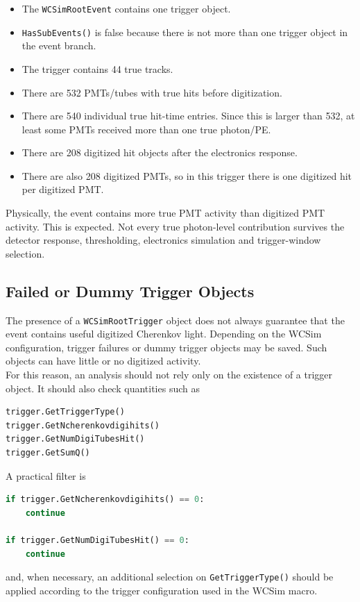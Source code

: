\documentclass{article}
\numberwithin{table}{subsection}
\numberwithin{figure}{subsection}
\numberwithin{equation}{subsection}
\numberwithin{footnote}{subsection}
\begin{document}
\begin{itemize}
    \item The \texttt{WCSimRootEvent} contains one trigger object.
    \item \texttt{HasSubEvents()} is false because there is not more than one
    trigger object in the event branch.
    \item The trigger contains 44 true tracks.
    \item There are 532 PMTs/tubes with true hits before digitization.
    \item There are 540 individual true hit-time entries. Since this is larger
    than 532, at least some PMTs received more than one true photon/PE.
    \item There are 208 digitized hit objects after the electronics response.
    \item There are also 208 digitized PMTs, so in this trigger there is one
    digitized hit per digitized PMT.
\end{itemize}
Physically, the event contains more true PMT activity than digitized PMT
activity. This is expected. Not every true photon-level contribution survives the
detector response, thresholding, electronics simulation and trigger-window
selection.

\subsection{Failed or Dummy Trigger Objects}

The presence of a \texttt{WCSimRootTrigger} object does not always guarantee that
the event contains useful digitized Cherenkov light. Depending on the WCSim
configuration, trigger failures or dummy trigger objects may be saved. Such
objects can have little or no digitized activity.\\
For this reason, an analysis should not rely only on the existence of a trigger
object. It should also check quantities such as

\begin{lstlisting}[language=python]
trigger.GetTriggerType()
trigger.GetNcherenkovdigihits()
trigger.GetNumDigiTubesHit()
trigger.GetSumQ()
\end{lstlisting}
A practical filter is
\begin{lstlisting}[language=python]
if trigger.GetNcherenkovdigihits() == 0:
    continue

if trigger.GetNumDigiTubesHit() == 0:
    continue
\end{lstlisting}
and, when necessary, an additional selection on \texttt{GetTriggerType()} should
be applied according to the trigger configuration used in the WCSim macro.
\end{document}
